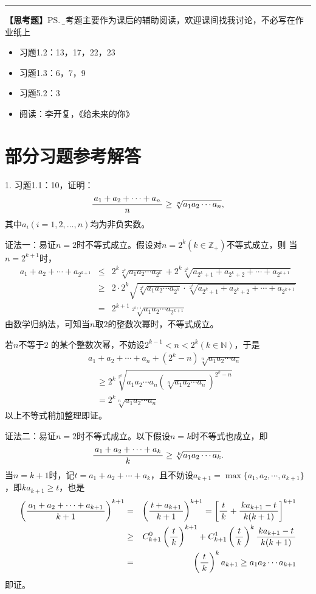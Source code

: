 \bigskip

\hrule

\bigskip
\bigskip

{\bf 【思考题】}\ps{\b 思考题主要作为课后的辅助阅读，欢迎课间找我讨论，不必写在作业纸上}

\begin{itemize}
  \item 习题1.2：13，17，22，23
  \item 习题1.3：6，7，9
  \item 习题5.2：3
  \item 阅读：李开复，《给未来的你》
\end{itemize}

\newpage

\section*{部分习题参考解答}

1. 习题1.1：10，证明：
$$\displaystyle\frac{\,{a_1+a_2+\cdots+a_n}\,}{\,{n}\,}\geq\sqrt[n]{a_1a_2\cdots a_n},$$
其中$a_i(i=1,2,\ldots,n)$均为非负实数。

证法一：易证$n=2$时不等式成立。假设对$n=2^k(k\in\mathbb{Z}_+)$不等式成立，则
当$n=2^{k+1}$时，
\begin{eqnarray*}
	a_1+a_2+\cdots+a_{2^{k+1}}&\leq&2^k\sqrt[2^k]{a_1a_2\cdots a_{2^k}}
	+2^k\sqrt[2^k]{a_{2^k+1}+a_{2^k+2}+\cdots+a_{2^{k+1}}}\\
	&\geq&2\cdot 2^k\sqrt{\sqrt[2^k]{a_1a_2\cdots a_{2^k}}\cdot
	\sqrt[2^k]{a_{2^k+1}+a_{2^k+2}+\cdots+a_{2^{k+1}}}}\\
	&=&2^{k+1}\sqrt[2^{k+1}]{a_1a_2\cdots a_{2^{k+1}}}
\end{eqnarray*}
由数学归纳法，可知当$n$取$2$的整数次幂时，不等式成立。

若$n$不等于$2$
的某个整数次幂，不妨设$2^{k-1}<n<2^k(k\in\mathbb{N})$，于是
\begin{eqnarray*}
	& &a_1+a_2+\cdots+a_n+\left(2^k-n\right)\sqrt[n]{a_1a_2\cdots a_n}\\
	& & \quad\geq 2^k\sqrt[2^k]{a_1a_2\cdots a_n\left(\sqrt[n]{a_1a_2\cdots
	a_n}\right)^{2^k-n}}\\
	& &\quad =2^k\sqrt[n]{a_1a_2\cdots a_n}
\end{eqnarray*}
以上不等式稍加整理即证。

证法二：易证$n=2$时不等式成立。以下假设$n=k$时不等式也成立，即
$$\displaystyle\frac{\,{a_1+a_2+\cdots+a_k}\,}{\,{k}\,}\geq\sqrt[k]{a_1a_2\cdots a_k}.$$
当$n=k+1$时，记$t=a_1+a_2+\cdots+a_k$，且不妨设$a_{k+1}=\max\{a_1,a_2,
\cdots,a_{k+1}\}$，即$ka_{k+1}\geq t$，也是
\begin{eqnarray*}
	\left(\displaystyle\frac{\,{a_1+a_2+\cdots+a_{k+1}}\,}{\,{k+1}\,}\right)^{k+1}
	&=&\left(\displaystyle\frac{\,{t+a_{k+1}}\,}{\,{k+1}\,}\right)^{k+1}
	=\left[\displaystyle\frac{\,{t}\,}{\,{k}\,}+\displaystyle\frac{\,{ka_{k+1}-t}\,}{\,{k(k+1)}\,}\right]^{k+1}\\
	&\geq&C_{k+1}^0\left(\displaystyle\frac{\,{t}\,}{\,{k}\,}\right)^{k+1}+C_{k+1}^1\left(\displaystyle\frac{\,{t}\,}{\,{k}\,}\right)^k
	\displaystyle\frac{\,{ka_{k+1}-t}\,}{\,{k(k+1)}\,}\\
	&=&\left(\displaystyle\frac{\,{t}\,}{\,{k}\,}\right)^ka_{k+1}\geq a_1a_2\cdots a_{k+1}
\end{eqnarray*}
即证。
\bigskip

